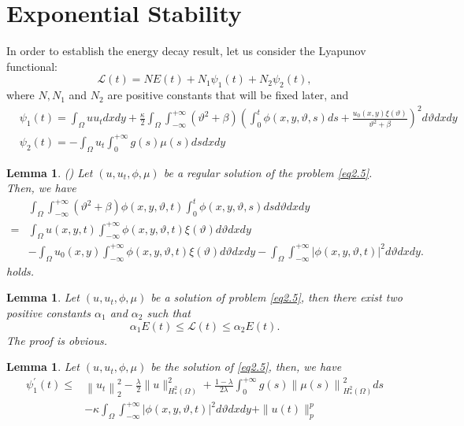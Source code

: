 \documentclass[12pt]{article}
\numberwithin{equation}{section}
\newtheorem{lemma}[theorem]{Lemma}
\begin{document}
\section{Exponential Stability}\label{sec_stability}
In order to establish the energy decay result, let us consider the Lyapunov functional:
\begin{equation}\label{eq5.1}
\mathcal{L}(t)=N E(t)+N_{1} \psi_{1}(t)+N_2\psi_{2}(t),
\end{equation}
where $N, N_{1}$ and $N_{2}$ are positive constants that will be fixed later, and
$$
\begin{aligned}
& \psi_{1}(t)=\int_{\Omega} u u_{t} d x dy+\frac{\kappa}{2}\int_{\Omega} \int_{-\infty}^{+\infty}\left(\vartheta^{2}+\beta\right)\left(\int_{0}^{t} \phi(x,y,\vartheta,s) d s+\frac{u_{0}(x,y) \xi(\vartheta)}{\vartheta^{2}+\beta}\right)^{2} d \vartheta dx dy \\
& \psi_{2}(t)=-\int_{\Omega} u_{t} \int_{0}^{+\infty} g(s) \mu(s) ds dx dy
\end{aligned}
$$
\begin{lemma}\label{lemimpo}(\cite{aslam25})
Let $(u, u_t, \phi, \mu)$ be a regular solution of the problem \eqref{eq2.5}. Then, we have
$$
\begin{aligned}
& \int_{\Omega} \int_{-\infty}^{+\infty}\left(\vartheta^{2}+\beta\right) \phi(x,y,\vartheta,t) \int_{0}^{t} \phi(x,y,\vartheta,s) ds d\vartheta dx dy \\
= & \int_{\Omega} u(x,y,t) \int_{-\infty}^{+\infty} \phi(x,y,\vartheta,t) \xi(\vartheta) d\vartheta dx dy \\
& -\int_{\Omega} u_{0}(x,y) \int_{-\infty}^{+\infty} \phi(x,y,\vartheta,t) \xi(\vartheta) d\vartheta dx dy-\int_{\Omega} \int_{-\infty}^{+\infty}|\phi(x,y,\vartheta,t)|^{2} d\vartheta dx dy.
\end{aligned}
$$
holds.
\end{lemma}
\begin{lemma}
Let $(u, u_t, \phi, \mu)$ be a solution of problem \eqref{eq2.5}, then there exist two positive constants $\alpha_{1}$ and $\alpha_{2}$ such that
\begin{equation}\label{equ5.4}
\alpha_{1} E(t) \leq \mathcal{L}(t) \leq \alpha_{2} E(t).
\end{equation}
The proof is obvious.
\end{lemma}
\begin{lemma}
Let $(u, u_t, \phi, \mu)$ be the solution of \eqref{eq2.5}, then, we have
\begin{equation}
\begin{aligned}\label{equ5.5}
\psi_{1}^{\prime}(t)\leq & \left\|u_{t}\right\|_{2}^{2}-\frac{\lambda}{2}\|u\|^2_{H^2_*(\Omega)}+\frac{1-\lambda}{2\lambda} \int_{0}^{+\infty} g(s)\left\|\mu(s)\right\|^2_{H^2_*(\Omega)} d s \\
& -\kappa \int_{\Omega} \int_{-\infty}^{+\infty}|\phi(x,y,\vartheta,t)|^2 d\vartheta dx dy+\|u(t)\|_{p}^{p}
\end{aligned}
\end{equation}
\end{lemma}
\end{document}
